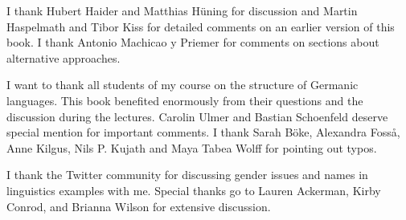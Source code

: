 \addchap{\lsAcknowledgementTitle} 

I thank Hubert Haider and Matthias Hüning for discussion and Martin Haspelmath and Tibor Kiss for detailed comments
on an earlier version of this book. I thank Antonio Machicao y Priemer for comments on sections
about alternative approaches.

I want to thank all students of my course on the structure of Germanic languages. This book
benefited enormously from their questions and the discussion during the lectures. 
Carolin Ulmer %
and
Bastian Schoenfeld %
deserve special mention for important comments. I thank 
Sarah Böke,
Alexandra Fosså,
Anne Kilgus,
Nils P. Kujath
and 
Maya Tabea Wolff  
for pointing out typos.


I thank the Twitter community for discussing gender issues and names in linguistics examples with
me. Special thanks go to Lauren Ackerman, Kirby Conrod, and Brianna Wilson for extensive discussion.




